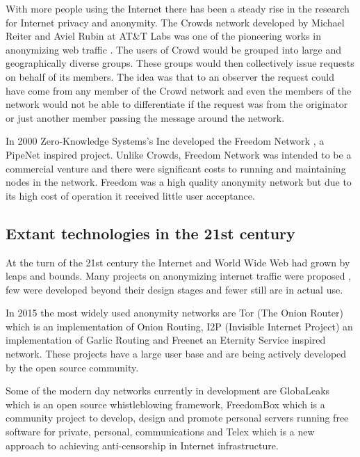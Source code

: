 \documentclass{llncs}
\begin{document}
With more people using the Internet there has been a steady rise in the research for Internet privacy and anonymity. The Crowds network developed by Michael Reiter and Aviel Rubin at AT\&T Labs was one of the pioneering works in anonymizing web traffic \cite{crowds:tissec}. The users of Crowd would be grouped into large and geographically diverse groups. These groups would then collectively issue requests on behalf of its members. The idea was that to an observer the request could have come from any member of the Crowd network and even the members of the network would not be able to differentiate if the request was from the originator or just another member passing the message around the network.

In 2000 Zero-Knowledge Systems's Inc developed the Freedom Network \cite{freedom2-arch}, a PipeNet inspired project. Unlike Crowds, Freedom Network was intended to be a commercial venture and there were significant costs to running and maintaining nodes in the network. Freedom was a high quality anonymity network but due to its high cost of operation it received little user acceptance.


\subsection{Extant technologies in the 21st century}

At the turn of the 21st century the Internet and World Wide Web had grown by leaps and bounds. Many projects on anonymizing internet traffic were proposed \cite{goldberg97privacyenhancing} \cite{fiveyearslater}, few were developed beyond their design stages and fewer still are in actual use.

In 2015 the most widely used anonymity networks are Tor (The Onion Router) \cite{tor-design} which is an implementation of Onion Routing, I2P (Invisible Internet Project) \cite{delmer-mthesis} an implementation of Garlic Routing and Freenet \cite{freenet} an Eternity Service inspired network. These projects have a large user base and are being actively developed by the open source community.

Some of the modern day networks currently in development are GlobaLeaks \cite{globaleaks} which is an open source whistleblowing framework, FreedomBox \cite{freedom-box} which is a community project to develop, design and promote personal servers running free software for private, personal, communications and Telex \cite{telex11} which is a new approach to achieving anti-censorship in Internet infrastructure. 
\end{document}
